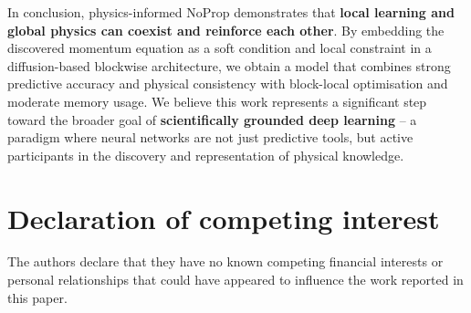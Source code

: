 \documentclass[preprint,12pt]{elsarticle}
\begin{document}
In conclusion, physics-informed NoProp demonstrates that \textbf{local learning and global physics can coexist and reinforce each other}. By embedding the discovered momentum equation as a soft condition and local constraint in a diffusion-based blockwise architecture, we obtain a model that combines strong predictive accuracy and physical consistency with block-local optimisation and moderate memory usage. We believe this work represents a significant step toward the broader goal of \textbf{scientifically grounded deep learning} -- a paradigm where neural networks are not just predictive tools, but active participants in the discovery and representation of physical knowledge.


\section*{Declaration of competing interest}
The authors declare that they have no known competing financial interests or personal relationships that could have appeared to influence the work reported in this paper.

% 
%
\end{document}

